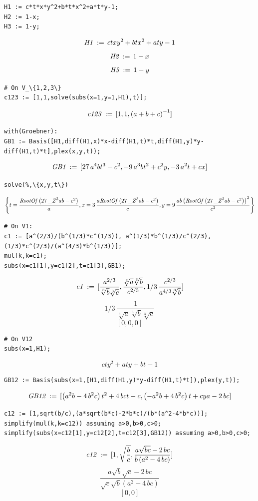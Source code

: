 \documentclass[11pt]{article}
\begin{document}
\begin{verbatim}
H1 := c*t*x*y^2+b*t*x^2+a*t*y-1;
H2 := 1-x;
H3 := 1-y;
\end{verbatim}
\[\displaystyle {\it H1}\, := \,ctx{y}^{2}+bt{x}^{2}+aty-1\]
\[\displaystyle {\it H2}\, := \,1-x\]
\[\displaystyle {\it H3}\, := \,1-y\]

\begin{verbatim}
# On V_\{1,2,3\}
c123 := [1,1,solve(subs(x=1,y=1,H1),t)];
\end{verbatim}
\[\displaystyle {\it c123}\, := \,[1,1, \left( a+b+c \right) ^{-1}]\]


\begin{verbatim} 
with(Groebner):
GB1 := Basis([H1,diff(H1,x)*x-diff(H1,t)*t,diff(H1,y)*y-diff(H1,t)*t],plex(x,y,t));
\end{verbatim}
\[\displaystyle {\it GB1}\, := \,[27\,{a}^{4}b{t}^{3}-{c}^{2},-9\,{a}^{3}b{t}^{2}+{c}^{2}y,-3\,{a}^{2}t+cx]\]

\begin{verbatim} 
solve(%,\{x,y,t\})
\end{verbatim}
\[\displaystyle  \left\{ t={\frac {{\it RootOf} \left( 27\,{{\it \_Z}}^{3}ab-{c}^{2} \right) }{a}},x=3\,{\frac {a{\it RootOf} \left( 27\,{{\it \_Z}}^{3}ab-{c}^{2} \right) }{c}},y\\
\mbox{}=9\,{\frac {ab \left( {\it RootOf} \left( 27\,{{\it
            \_Z}}^{3}ab-{c}^{2} \right)  \right) ^{2}}{{c}^{2}}}
\right\} \]

\begin{verbatim}
# On V1:
c1 := [a^(2/3)/(b^(1/3)*c^(1/3)), a^(1/3)*b^(1/3)/c^(2/3), (1/3)*c^(2/3)/(a^(4/3)*b^(1/3))];
mul(k,k=c1);
subs(x=c1[1],y=c1[2],t=c1[3],GB1);
\end{verbatim}
\[\displaystyle {\it c1}\, := \,[{\frac {{a}^{2/3}}{\sqrt [3]{b}\sqrt [3]{c}}},{\frac {\sqrt [3]{a}\sqrt [3]{b}}{{c}^{2/3}}},1/3\,{\frac {{c}^{2/3}}{{a}^{4/3}\sqrt [3]{b}}}]\]
\[\displaystyle 1/3\,{\frac {1}{\sqrt [3]{a}\sqrt [3]{b}\sqrt [3]{c}}}\]
\[\displaystyle [0,0,0]\]

\begin{verbatim}
# On V12
subs(x=1,H1);
\end{verbatim}
\[\displaystyle ct{y}^{2}+aty+bt-1\]

\begin{verbatim}
GB12 := Basis(subs(x=1,[H1,diff(H1,y)*y-diff(H1,t)*t]),plex(y,t));
\end{verbatim}
\[\displaystyle {\it GB12}\, := \,[ \left( {a}^{2}b-4\,{b}^{2}c
\right) {t}^{2}+4\,bct-c, \left( -{a}^{2}b+4\,{b}^{2}c \right)
t+cya-2\,bc]\]
\begin{verbatim}
c12 := [1,sqrt(b/c),(a*sqrt(b*c)-2*b*c)/(b*(a^2-4*b*c))];
simplify(mul(k,k=c12)) assuming a>0,b>0,c>0;
simplify(subs(x=c12[1],y=c12[2],t=c12[3],GB12)) assuming a>0,b>0,c>0;
\end{verbatim}
\[\displaystyle {\it c12}\, := \,[1, \sqrt{{\frac {b}{c}}},{\frac {a
    \sqrt{bc}-2\,bc}{b \left( {a}^{2}-4\,bc \right)
  }}]\]\[\displaystyle {\frac {a \sqrt{b} \sqrt{c}-2\,bc}{ \sqrt{c}
    \sqrt{b} \left( {a}^{2}-4\,bc \right) }}\]\[\displaystyle [0,0]\]
\end{document}

